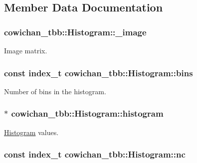 \subsection{Member Data Documentation}
\hypertarget{classcowichan__tbb_1_1_histogram_61380a3024f267b7774c5be8866c4d24}{
\subsubsection[{\_\-image}]{ {\bf cowichan\_\-tbb::Histogram::\_\-image}}}
\label{classcowichan__tbb_1_1_histogram_61380a3024f267b7774c5be8866c4d24}


Image matrix. \hypertarget{classcowichan__tbb_1_1_histogram_6cfc91c005e0a2e66da9d7a630c4892c}{
\subsubsection[{bins}]{\setlength{\rightskip}{0pt plus 5cm}const {\bf index\_\-t} {\bf cowichan\_\-tbb::Histogram::bins}}}
\label{classcowichan__tbb_1_1_histogram_6cfc91c005e0a2e66da9d7a630c4892c}


Number of bins in the histogram. \hypertarget{classcowichan__tbb_1_1_histogram_6b904f84e79ce3a05178df4fbaf60beb}{
\subsubsection[{histogram}]{$\ast$ {\bf cowichan\_\-tbb::Histogram::histogram}}}
\label{classcowichan__tbb_1_1_histogram_6b904f84e79ce3a05178df4fbaf60beb}


\hyperlink{classcowichan__tbb_1_1_histogram}{Histogram} values. \hypertarget{classcowichan__tbb_1_1_histogram_20345a7d3c1bc558e4b892681549bfda}{
\subsubsection[{nc}]{\setlength{\rightskip}{0pt plus 5cm}const {\bf index\_\-t} {\bf cowichan\_\-tbb::Histogram::nc}}}
\label{classcowichan__tbb_1_1_histogram_20345a7d3c1bc558e4b892681549bfda}


